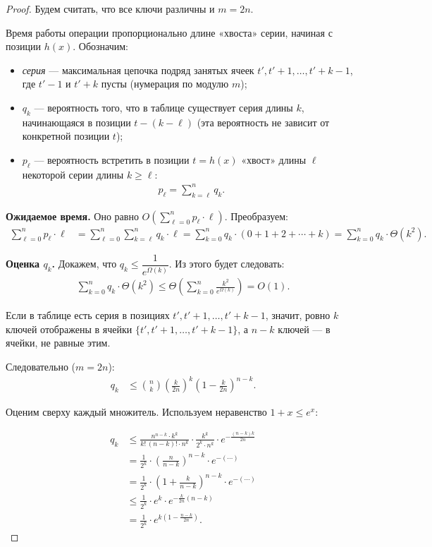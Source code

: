 \begin{proof}
	Будем считать, что все ключи различны и $m = 2n$.
	
	Время работы операции пропорционально длине «хвоста» серии, начиная с позиции $h(x)$. Обозначим:
	\begin{itemize}
		\item \emph{серия} — максимальная цепочка подряд занятых ячеек $t', t'+1, \ldots, t'+k-1$, где $t'-1$ и $t'+k$ пусты (нумерация по модулю $m$);
		\item $q_k$ — вероятность того, что в таблице существует серия длины $k$, начинающаяся в позиции $t - (k - \ell)$ (эта вероятность не зависит от конкретной позиции $t$);
		\item $p_\ell$ — вероятность встретить в позиции $t = h(x)$ «хвост» длины $\ell$ некоторой серии длины $k \geq \ell$:
		\begin{align*}
			p_\ell = \sum_{k=\ell}^{n} q_k.
		\end{align*}
	\end{itemize}
	
	\noindent\textbf{Ожидаемое время.} Оно равно $O\!\left(\displaystyle\sum_{\ell=0}^{n} p_\ell \cdot \ell\right)$. Преобразуем:
	\begin{align*}
		\sum_{\ell=0}^{n} p_\ell \cdot \ell
		&= \sum_{\ell=0}^{n} \sum_{k=\ell}^{n} q_k \cdot \ell
		= \sum_{k=0}^{n} q_k \cdot (0 + 1 + 2 + \cdots + k)
		= \sum_{k=0}^{n} q_k \cdot \Theta(k^2).
	\end{align*}
	
	\noindent\textbf{Оценка $q_k$.} Докажем, что $q_k \leq \dfrac{1}{e^{\Omega(k)}}$. Из этого будет следовать:
	\begin{align*}
		\sum_{k=0}^{n} q_k \cdot \Theta(k^2)
		\leq \Theta\!\left(\sum_{k=0}^{n} \frac{k^2}{e^{\Omega(k)}}\right) = O(1).
	\end{align*}
	
	Если в таблице есть серия в позициях $t', t'+1, \ldots, t'+k-1$, значит, ровно $k$ ключей отображены в ячейки $\{t', t'+1, \ldots, t'+k-1\}$, а $n - k$ ключей — в ячейки, не равные этим.
	
	Следовательно ($m = 2n$):
	\begin{align*}
		q_k
		&\leq \binom{n}{k} \left(\frac{k}{2n}\right)^{\!k} \left(1 - \frac{k}{2n}\right)^{\!n-k}.
	\end{align*}
	
	Оценим сверху каждый множитель. Используем неравенство $1 + x \leq e^x$:
	
	\begin{align*}
		q_k
		&\leq \frac{n^{n-k} \cdot k^k}{k!\,(n-k)! \cdot n^k} \cdot \frac{k^k}{2^k \cdot n^k} \cdot e^{-\frac{(n-k)k}{2n}} \\[4pt]
		&= \frac{1}{2^k} \cdot \left(\frac{n}{n-k}\right)^{\!n-k} \cdot e^{-(\cdots)} \\[4pt]
		&= \frac{1}{2^k} \cdot \left(1 + \frac{k}{n-k}\right)^{\!n-k} \cdot e^{-(\cdots)} \\[4pt]
		&\leq \frac{1}{2^k} \cdot e^{k} \cdot e^{-\frac{k}{2n}(n-k)} \\[4pt]
		&= \frac{1}{2^k} \cdot e^{k\!\left(1 - \frac{n-k}{2n}\right)}.
	\end{align*}
	

\end{proof}
